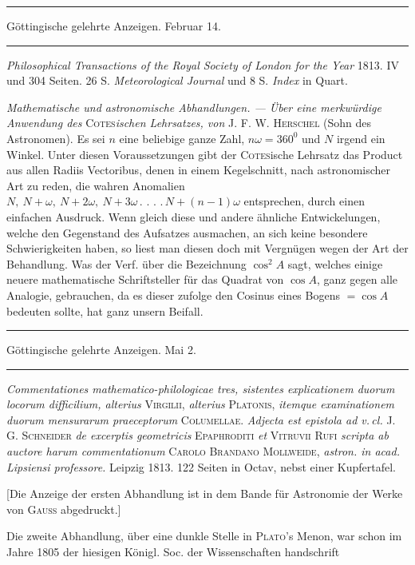 \par
{}%
\begin{center}
\rule{.85\textwidth}{.3pt}\par
Göttingische gelehrte Anzeigen. Februar 14.\par
\rule{.85\textwidth}{.3pt}
\end{center}
\hspace*{\parindent}\textit{Philosophical Transactions of the Royal Society of London for the Year} 1813. IV und 304 Seiten. 26 S. \textit{Meteorological Journal} und 8 S. \textit{Index} in Quart.

\textit{Mathematische und astronomische Abhandlungen. --- Über eine merkwürdige Anwendung des} \textsc{Cotes}\textit{ischen Lehrsatzes, von} \textsc{J. F. W. Herschel} (Sohn des Astronomen). Es sei \(n\) eine beliebige ganze Zahl, \(n\omega=360^0\) und \(N\) irgend ein Winkel. Unter diesen Voraussetzungen gibt der \textsc{Cotes}ische Lehrsatz das Product aus allen Radiis Vectoribus, denen in einem Kegelschnitt, nach astronomischer Art zu reden, die wahren Anomalien \(N,\ N+\omega,\ N+2\omega,\ N+3\omega\mathpunct{.}\mathpunct{.}\mathpunct{.}\mathpunct{.}N+(n-1)\omega\) entsprechen, durch einen einfachen Ausdruck. Wenn gleich diese und andere ähnliche Entwickelungen, welche den Gegenstand des Aufsatzes ausmachen, an sich keine besondere Schwierigkeiten haben, so liest man diesen doch mit Vergnügen wegen der Art der Behandlung. Was der Verf. über die Bezeichnung \(\cos^2 A\) sagt, welches einige neuere mathematische Schriftsteller für das Quadrat von \(\cos A\), ganz gegen alle Analogie, gebrauchen, da es dieser zufolge den Cosinus eines Bogens \(=\cos A\) bedeuten sollte, hat ganz unsern Beifall.

\begin{center}
\rule{.85\textwidth}{.3pt}\par
Göttingische gelehrte Anzeigen. Mai 2.\par
\rule{.85\textwidth}{.3pt}
\end{center}
\hspace*{\parindent}\textit{Commentationes mathematico-philologicae tres, sistentes explicationem duorum locorum difficilium, alterius} \textsc{Virgilii}, \textit{alterius} \textsc{Platonis}, \textit{itemque examinationem duorum mensurarum praeceptorum} \textsc{Columellae}. \textit{Adjecta est epistola ad v.\,cl.} \textsc{J. G. Schneider} \textit{de excerptis geometricis} \textsc{Epaphroditi} \textit{et} \textsc{Vitruvii Rufi} \textit{scripta ab auctore harum commentationum} \textsc{Carolo Brandano Mollweide}, \textit{astron. in acad. Lipsiensi professore.} Leipzig 1813. 122 Seiten in Octav, nebst einer Kupfertafel.

[Die Anzeige der ersten Abhandlung ist in dem Bande für Astronomie der Werke von \textsc{Gauss} abgedruckt.]

Die zweite Abhandlung, über eine dunkle Stelle in \textsc{Plato}'s Menon, war schon im Jahre 1805 der hiesigen Königl. Soc. der Wissenschaften handschrift%
